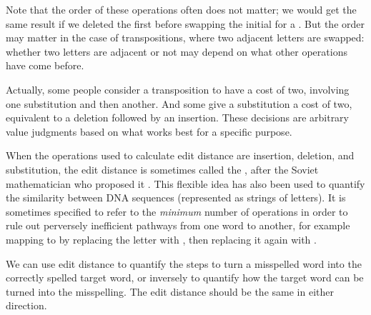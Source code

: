 Note that the order of these operations often does not matter; we would get the same result if we deleted the first  before swapping the initial  for a .  But the order may matter in the case of transpositions, where two adjacent letters are swapped: whether two letters are adjacent or not may depend on what other operations have come before.

Actually, some people consider a transposition to have a cost of two, involving one substitution and then another. And some give a substitution  a cost of two, equivalent to a deletion followed by an insertion. These decisions are arbitrary value judgments based on what works best for a specific purpose.


When the operations used to calculate edit distance are insertion, deletion, and substitution, the edit distance is sometimes called the , after the Soviet mathematician who proposed it  \citep{Levenshtein:1966}. This flexible idea has also been used \citep{Sankoff:1992} to quantify the similarity between DNA sequences (represented as strings of letters).  It is sometimes specified to refer to the \emph{minimum} number of operations in order to rule out perversely inefficient pathways from one word to another, for example mapping  to  by replacing the letter  with , then replacing it again with .  

We can use edit distance to quantify the steps to turn a misspelled word into the correctly spelled target word, or inversely to quantify how the target word can be turned into the misspelling.  The edit distance should be the same in either direction.




